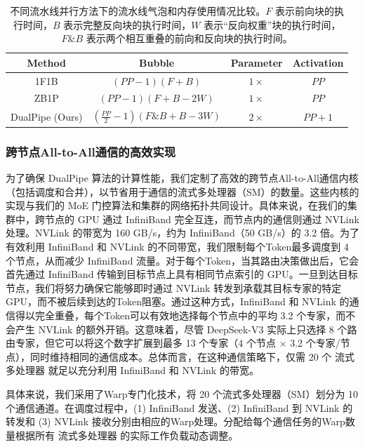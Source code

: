 \documentclass[lang=cn,a4paper,newtx]{elegantpaper}
\newcommand{\dsviii}{DeepSeek-V3}
\begin{document}
\begin{table}[t]
    \centering
    \setlength{\tabcolsep}{15pt}
    \begin{tabular}{c c c c}
        \toprule
        \textbf{Method} & \textbf{Bubble} & \textbf{Parameter} & \textbf{Activation} \\
        \midrule
        1F1B     & $(PP - 1)(F + B)$       & $1\times$ & $PP$ \\
        ZB1P     & $(PP - 1)(F + B - 2W)$   & $1\times$ & $PP$ \\
        DualPipe (Ours) & $(\frac{PP}{2} - 1)(F\&B + B - 3W)$ & $2\times$ & $PP + 1$ \\
        \bottomrule
    \end{tabular}
    \caption{
        不同流水线并行方法下的流水线气泡和内存使用情况比较。$F$ 表示前向块的执行时间，$B$ 表示完整反向块的执行时间，$W$ 表示“反向权重”块的执行时间，$F\&B$ 表示两个相互重叠的前向和反向块的执行时间。
    }
    \label{tab:dualpipe-bubble}
\end{table}

\subsubsection{跨节点All-to-All通信的高效实现}

为了确保 DualPipe 算法的计算性能，我们定制了高效的跨节点All-to-All通信内核（包括调度和合并），以节省用于通信的流式多处理器（SM）的数量。这些内核的实现与我们的 MoE 门控算法和集群的网络拓扑共同设计。具体来说，在我们的集群中，跨节点的 GPU 通过 InfiniBand 完全互连，而节点内的通信则通过 NVLink 处理。NVLink 的带宽为 160 GB/s，约为 InfiniBand（50 GB/s）的 3.2 倍。为了有效利用 InfiniBand 和 NVLink 的不同带宽，我们限制每个Token最多调度到 4 个节点，从而减少 InfiniBand 流量。对于每个Token，当其路由决策做出后，它会首先通过 InfiniBand 传输到目标节点上具有相同节点索引的 GPU。一旦到达目标节点，我们将努力确保它能够即时通过 NVLink 转发到承载其目标专家的特定 GPU，而不被后续到达的Token阻塞。通过这种方式，InfiniBand 和 NVLink 的通信得以完全重叠，每个Token可以有效地选择每个节点中的平均 3.2 个专家，而不会产生 NVLink 的额外开销。这意味着，尽管 \dsviii{} 实际上只选择 8 个路由专家，但它可以将这个数字扩展到最多 13 个专家（4 个节点 × 3.2 个专家/节点），同时维持相同的通信成本。总体而言，在这种通信策略下，仅需 20 个 流式多处理器 就足以充分利用 InfiniBand 和 NVLink 的带宽。

具体来说，我们采用了Warp专门化技术，将 20 个流式多处理器（SM）划分为 10 个通信通道。在调度过程中，(1) InfiniBand 发送、(2) InfiniBand 到 NVLink 的转发和 (3) NVLink 接收分别由相应的Warp处理。分配给每个通信任务的Warp数量根据所有 流式多处理器 的实际工作负载动态调整。
\end{document}
